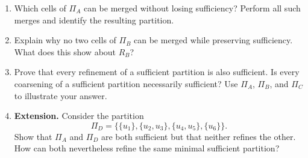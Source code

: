 \documentclass[11pt]{article}
\begin{document}
\begin{exercise}
\begin{enumerate}
    \item Which cells of $\Pi_A$ can be merged without losing sufficiency?
      Perform all such merges and identify the resulting partition.

    \item Explain why no two cells of $\Pi_B$ can be merged while preserving
      sufficiency. What does this show about $R_B$?

    \item Prove that every refinement of a sufficient partition is also
      sufficient. Is every coarsening of a sufficient partition necessarily
      sufficient? Use $\Pi_A$, $\Pi_B$, and $\Pi_C$ to illustrate your answer.

    \item \textbf{Extension.} Consider the partition
      \[
        \Pi_D
          =\bigl\{\{u_1\},\{u_2,u_3\},\{u_4,u_5\},\{u_6\}\bigr\}.
      \]
      Show that $\Pi_A$ and $\Pi_D$ are both sufficient but that neither
      refines the other. How can both nevertheless refine the same minimal
      sufficient partition?
  \end{enumerate}
\end{exercise}
\end{document}
